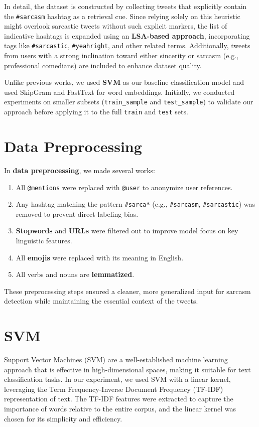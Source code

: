 \documentclass[11pt]{article}
\begin{document}
In detail, the dataset is constructed by collecting tweets that explicitly contain the \texttt{\#sarcasm} hashtag as a retrieval cue. Since relying solely on this heuristic might overlook sarcastic tweets without such explicit markers, the list of indicative hashtags is expanded using an \textbf{LSA-based approach}, incorporating tags like \texttt{\#sarcastic}, \texttt{\#yeahright}, and other related terms. Additionally, tweets from users with a strong inclination toward either sincerity or sarcasm (e.g., professional comedians) are included to enhance dataset quality.

Unlike previous works, we used \textbf{SVM} as our baseline classification model and used SkipGram and FastText for word embeddings. Initially, we conducted experiments on smaller subsets (\texttt{train\_sample} and \texttt{test\_sample}) to validate our approach before applying it to the full \texttt{train} and \texttt{test} sets.

\section{Data Preprocessing}
In \textbf{data preprocessing}, we made several works:
\begin{enumerate}
    \item All \texttt{@mentions} were replaced with \texttt{@user} to anonymize user references.
    \item Any hashtag matching the pattern \texttt{\#sarca*} (e.g., \texttt{\#sarcasm}, \texttt{\#sarcastic}) was removed to prevent direct labeling bias.
    \item \textbf{Stopwords} and \textbf{URLs} were filtered out to improve model focus on key linguistic features.
    \item All \textbf{emojis} were replaced with its meaning in English.
    \item All verbs and nouns are \textbf{lemmatized}.
\end{enumerate}

These preprocessing steps ensured a cleaner, more generalized input for sarcasm detection while maintaining the essential context of the tweets.

\section{SVM}
Support Vector Machines (SVM) are a well-established machine learning approach that is effective in high-dimensional spaces, making it suitable for text classification tasks. In our experiment, we used SVM with a linear kernel, leveraging the Term Frequency-Inverse Document Frequency (TF-IDF) representation of text. The TF-IDF features were extracted to capture the importance of words relative to the entire corpus, and the linear kernel was chosen for its simplicity and efficiency.
\end{document}
